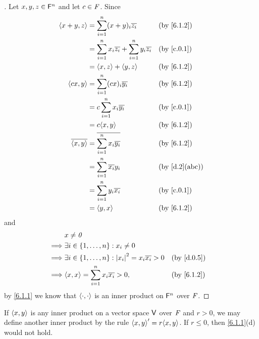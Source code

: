 \begin{proof}[]
	Let \(x, y, z \in \mathsf{F}^n\) and let \(c \in \mathit{F}\).
	Since
	\begin{align*}
		\inn{x + y, z}    & = \sum_{i = 1}^n (x + y)_i \conj{z_i}                           &  & \by{6.1.2}    \\
		                  & = \sum_{i = 1}^n x_i \conj{z_i} + \sum_{i = 1}^n y_i \conj{z_i} &  & \by{c.0.1}    \\
		                  & = \inn{x, z} + \inn{y, z}                                       &  & \by{6.1.2}    \\
		\inn{cx, y}       & = \sum_{i = 1}^n (cx)_i \conj{y_i}                              &  & \by{6.1.2}    \\
		                  & = c \sum_{i = 1}^n x_i \conj{y_i}                               &  & \by{c.0.1}    \\
		                  & = c \inn{x, y}                                                  &  & \by{6.1.2}    \\
		\conj{\inn{x, y}} & = \conj{\sum_{i = 1}^n x_i \conj{y_i}}                          &  & \by{6.1.2}    \\
		                  & = \sum_{i = 1}^n \conj{x_i} y_i                                 &  & \by{d.2}[abc] \\
		                  & = \sum_{i = 1}^n y_i \conj{x_i}                                 &  & \by{c.0.1}    \\
		                  & = \inn{y, x}                                                    &  & \by{6.1.2}
	\end{align*}
	and
	\begin{align*}
		         & x \neq \zv                                                                         \\
		\implies & \exists i \in \set{1, \dots, n} : x_i \neq 0                                       \\
		\implies & \exists i \in \set{1, \dots, n} : \abs{x_i}^2 = x_i \conj{x_i} > 0 &  & \by{d.0.5} \\
		\implies & \inn{x, x} = \sum_{i = 1}^n x_i \conj{x_i} > 0,                    &  & \by{6.1.2}
	\end{align*}
	by \cref{6.1.1} we know that \(\left\langle\cdot, \cdot\right\rangle\) is an inner product on \(\mathsf{F}^n\) over \(\mathit{F}\).
\end{proof}

\begin{eg}\label{6.1.3}
	If \(\left\langle x, y\right\rangle\) is any inner product on a vector space \(\mathsf{V}\) over \(\mathit{F}\) and \(r > 0\), we may define another inner product by the rule \(\inn{x, y}' = r \inn{x, y}\).
	If \(r \leq 0\), then \cref{6.1.1}(d) would not hold.
\end{eg}

